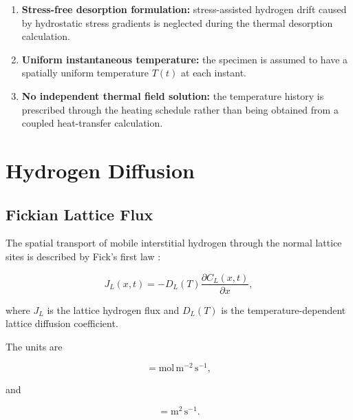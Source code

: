 \begin{enumerate}
    \item \textbf{Stress-free desorption formulation:}
    stress-assisted hydrogen drift caused by hydrostatic stress
    gradients is neglected during the thermal desorption calculation.

    \item \textbf{Uniform instantaneous temperature:}
    the specimen is assumed to have a spatially uniform temperature
    $T(t)$ at each instant.

    \item \textbf{No independent thermal field solution:}
    the temperature history is prescribed through the heating
    schedule rather than being obtained from a coupled heat-transfer
    calculation.

\end{enumerate}

\section{Hydrogen Diffusion}
\label{sec:hydrogen_diffusion}

\subsection{Fickian Lattice Flux}
\label{subsec:fickian_flux}

The spatial transport of mobile interstitial hydrogen through the
normal lattice sites is described by Fick's first law
\cite{Fallahmohammadi2013,Legrand2015,MartinezPaneda2020}:

\begin{equation}
J_L(x,t)
=
-D_L(T)
\frac{\partial C_L(x,t)}{\partial x},
\label{eq:ch3_fick_flux}
\end{equation}

where $J_L$ is the lattice hydrogen flux and $D_L(T)$ is the
temperature-dependent lattice diffusion coefficient.

The units are

\begin{equation}
[J_L]=\mathrm{mol\,m^{-2}\,s^{-1}},
\end{equation}

and

\begin{equation}
[D_L]=\mathrm{m^2\,s^{-1}}.
\end{equation}

